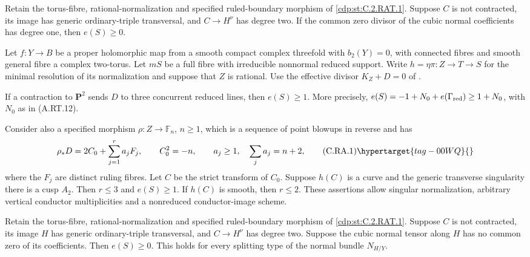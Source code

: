 
\begin{proposition}\hypertarget{tag-01CK}{}\label{cdp:st:C.2.RAT.8}


Retain the torus-fibre, rational-normalization and specified
ruled-boundary morphism of \ref{cdp:st:C.2.RAT.1}. Suppose $C$ is not
contracted, its image has generic ordinary-triple transversal,
and $C\to H^\nu$ has degree two. If the common zero divisor
of the cubic normal coefficients has degree one, then
$e(S)\ge0$.
\end{proposition}

\begin{proposition}\hypertarget{tag-01CD}{}\label{cdp:st:C.2.RAT.1}


Let $f:Y\to B$ be a proper holomorphic map from a smooth compact
complex threefold with $b_2(Y)=0$, with connected fibres and smooth
general fibre a complex two-torus. Let $mS$ be a full fibre with
irreducible nonnormal reduced support. Write
$h=\eta\pi:Z\to T\to S$ for the minimal resolution of its
normalization and suppose that $Z$ is rational. Use the effective
divisor $K_Z+D=0$ of .

If a contraction to $\mathbf P^2$ sends $D$ to three concurrent
reduced lines, then $e(S)\ge1$. More precisely,
$e(S)=-1+N_0+e(\Gamma_{\rm red})\ge1+N_0$, with $N_0$ as in
(A.RT.12).

Consider also a specified morphism $\rho:Z\to\mathbb F_n$,
$n\ge1$, which is a sequence of point blowups in reverse and has
\[
 \rho_*D=2C_0+\sum_{j=1}^r a_jF_j,\qquad
 C_0^2=-n,\qquad
 a_j\ge1,\quad \sum_j a_j=n+2,                  \tag{C.RA.1}\hypertarget{tag-00WQ}{}\label{cdp:eq:C.RA.1}
\]
where the $F_j$ are distinct ruling fibres. Let $C$ be the
strict transform of $C_0$. Suppose $h(C)$ is a curve and the
generic transverse singularity there is a cusp $A_2$.
Then $r\le3$ and $e(S)\ge1$. If $h(C)$ is smooth, then
$r\le2$. These assertions allow singular normalization,
arbitrary vertical conductor multiplicities and a nonreduced
conductor-image scheme.
\end{proposition}

\begin{proposition}\hypertarget{tag-01CJ}{}\label{cdp:st:C.2.RAT.7}


Retain the torus-fibre, rational-normalization and specified
ruled-boundary morphism of \ref{cdp:st:C.2.RAT.1}. Suppose $C$ is not
contracted, its image $H$ has generic ordinary-triple
transversal, and $C\to H^\nu$ has degree two. Suppose
the cubic normal tensor along $H$ has no common zero of
its coefficients. Then $e(S)\ge0$. This holds for every
splitting type of the normal bundle $N_{H/Y}$.
\end{proposition}


